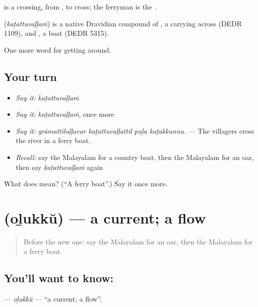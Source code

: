  is a crossing, from , to cross; the ferryman is the .

\begin{cousinweb}
\textbf{} (\emph{kaṭattuvaḷḷaṁ}) is a native Dravidian compound of , a carrying across (DEDR 1109), and , a boat (DEDR 5315).
\end{cousinweb}

\begin{grammarlens}[title={What you've built}]
One more word for getting around.
\end{grammarlens}

\subsection*{Your turn}
\begin{itemize}
\raggedright
  \item \emph{Say it:} \emph{kaṭattuvaḷḷaṁ}
  \item \emph{Say it:} \emph{kaṭattuvaḷḷaṁ}, once more
  \item \emph{Say it:} \emph{grāmattiluḷḷavar kaṭattuvaḷḷattil puḻa kaṭakkunnu.} — The villagers cross the river in a ferry boat.
  \item \emph{Recall:} say the Malayalam for a country boat, then the Malayalam for an oar, then say \emph{kaṭattuvaḷḷaṁ} again
\end{itemize}

\begin{tcolorbox}[breakable,colback=teal!4,colframe=teal!35!black,title={Before you move on}]
What does  mean? (\textquotedblleft{}A ferry boat\textquotedblright{}.) Say it once more.
\end{tcolorbox}
\section[\texorpdfstring{\ml{ഒഴുക്ക്} (oḻukkŭ)}{ഒഴുക്ക് (oḻukkŭ)}]{ (oḻukkŭ) — a current; a flow}

\label{lesson:ML-C476-olukku}



\begin{quote}
Before the new one: say the Malayalam for an oar, then the Malayalam for a ferry boat.
\end{quote}

\subsection*{You'll want to know: }
\textbf{} — \emph{oḻukkŭ} — \textquotedblleft{}a current; a flow\textquotedblright{}.


